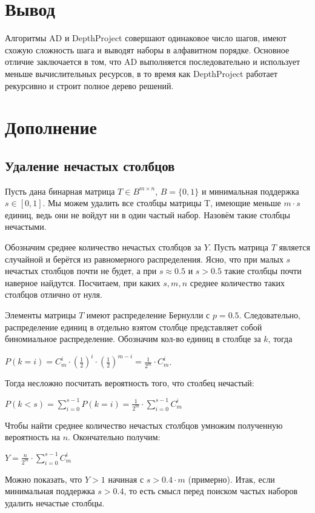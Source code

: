 \documentclass[a4paper, 12pt, oneside]{scrartcl}
\begin{document}
\section{Вывод}

Алгоритмы AD и DepthProject совершают одинаковое число шагов, имеют схожую сложность шага и выводят наборы в алфавитном порядке. Основное отличие заключается в том, что AD выполняется последовательно и использует меньше вычислительных ресурсов, в то время как DepthProject работает рекурсивно и строит полное дерево решений.

\section{Дополнение}

\subsection{Удаление нечастых столбцов}

Пусть дана бинарная матрица $T \in B^{m \times n}$, $B = \{0, 1\}$ и минимальная поддержка $s \in [0, 1]$. Мы можем удалить все столбцы матрицы T, имеющие меньше $m \cdot s$ единиц, ведь они не войдут ни в один частый набор. Назовём такие столбцы нечастыми.

Обозначим среднее количество нечастых столбцов за $Y$. Пусть матрица $T$ является случайной и берётся из равномерного распределения. Ясно, что при малых $s$ нечастых столбцов почти не будет, а при $s \approx 0.5$ и $s > 0.5$ такие столбцы почти наверное найдутся. Посчитаем, при каких $s, m, n$ среднее количество таких столбцов отлично от нуля.

Элементы матрицы $T$ имеют распределение Бернулли с $p = 0.5$. Следовательно, распределение единиц в отдельно взятом столбце представляет собой биномиальное распределение. Обозначим кол-во единиц в столбце за $k$, тогда \newline

$P(k = i) = C_m^i \cdot (\frac{1}{2})^i \cdot (\frac{1}{2})^{m-i} = \frac{1}{2^m} \cdot C_m^i$. \newline

Тогда несложно посчитать вероятность того, что столбец нечастый: \newline

$P(k < s) = \sum_{i = 0}^{s-1} P(k = i) = \frac{1}{2^m} \cdot \sum_{i = 0}^{s-1}C_m^i$ \newline

Чтобы найти среднее количество нечастых столбцов умножим полученную вероятность на $n$. Окончательно получим:\newline

$Y = \frac{n}{2^m} \cdot \sum_{i = 0}^{s-1}C_m^i$\newline

Можно показать, что $Y > 1$ начиная с $s > 0.4 \cdot m$ (примерно). Итак, если минимальная поддержка $s > 0.4$, то есть смысл перед поиском частых наборов удалить нечастые столбцы.
\end{document}

